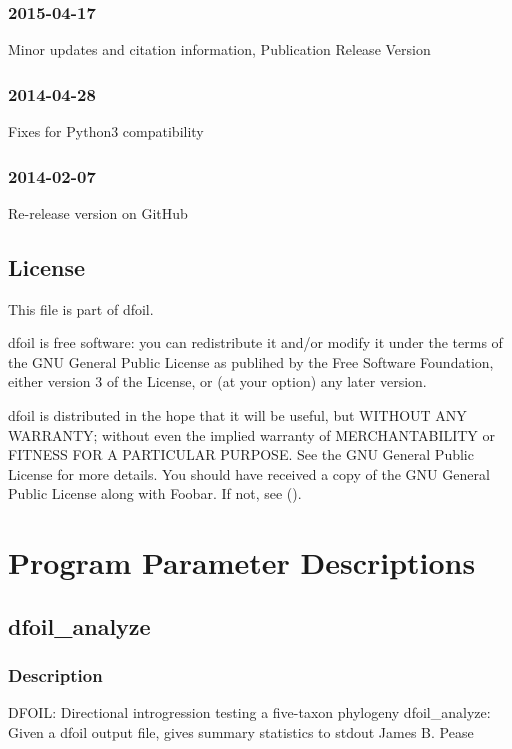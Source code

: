 \documentclass[letterpaper,12pt,english]{sphinxmanual}
\begin{document}
\subsection{2015-04-17}
\label{\detokenize{intro:id4}}
Minor updates and citation information, Publication Release Version


\subsection{2014-04-28}
\label{\detokenize{intro:id5}}
Fixes for Python3 compatibility


\subsection{2014-02-07}
\label{\detokenize{intro:id6}}
Re-release version on GitHub


\section{License}
\label{\detokenize{intro:license}}
This file is part of dfoil.

dfoil is free software: you can redistribute it and/or modify it under the terms of the GNU General Public License as publihed by the Free Software Foundation, either version 3 of the License, or (at your option) any later version.

dfoil is distributed in the hope that it will be useful, but WITHOUT ANY WARRANTY; without even the implied warranty of MERCHANTABILITY or FITNESS FOR A PARTICULAR PURPOSE.  See the GNU General Public License for more details. You should have received a copy of the GNU General Public License along with Foobar.  If not, see ().


\chapter{Program Parameter Descriptions}
\label{\detokenize{prog_desc::doc}}\label{\detokenize{prog_desc:program-parameter-descriptions}}

\section{dfoil\_analyze}
\label{\detokenize{prog_desc:dfoil-analyze}}

\subsection{Description}
\label{\detokenize{prog_desc:description}}
DFOIL: Directional introgression testing a five-taxon phylogeny
dfoil\_analyze: Given a dfoil output file, gives summary statistics to stdout
James B. Pease
\end{document}
